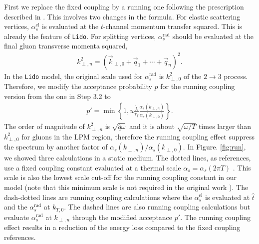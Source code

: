 \documentclass[aps, prc, reprint, amsmath, groupedaddress, nofootinbib]{revtex4-1}
\begin{document}
{First we replace the fixed coupling by a running one following the prescription described in \cite{Arnold:2008zu}.
This involves two changes in the formula. 
For elastic scattering vertices, $\alpha_s^{\textrm{el}}$ is evaluated at the $t$-channel momentum transfer squared. 
This is already the feature of {\tt Lido}.
For splitting vertices,  $\alpha_s^{\textrm{rad}}$ should be evaluated at the final gluon transverse momenta squared,
\begin{eqnarray}\label{eq:kTn}
k_{\perp,n}^2 = \left(\vec{k}_{\perp,0}+\vec{q}_1+\cdots+\vec{q}_n\right)^2.
\end{eqnarray} 
In the {\tt Lido} model, the original scale used for $\alpha_s^{\textrm{rad}}$ is $k_{\perp,0}^2$ of the $2\rightarrow 3$ process.
Therefore, we modify the acceptance probability $p$ for the running coupling version from the one in Step 3.2 to
\begin{eqnarray}
p' = \min\left\{1, u\frac{\tilde{\lambda}}{\tau_f}\frac{\alpha_s(k_{\perp,n})}{\alpha_s(k_{\perp,0})}\right\}.
\end{eqnarray}
The order of magnitude of $k_{\perp,n}^2$ is $\sqrt{\hat{q}\omega}$ and it is about $\sqrt{\omega/T}$ times larger than $k_{\perp,0}^2$ for gluons in the LPM region, therefore the running coupling effect suppress the spectrum by another factor of $\alpha_s(k_{\perp,n})/\alpha_s(k_{\perp,0})$.
In Figure. \ref{fig:run}, we showed three calculations in a static medium. The dotted lines, as references, use a fixed coupling constant evaluated at a thermal scale $\alpha_s = \alpha_s(2\pi T)$ .
This scale is also the lowest scale cut-off for the running coupling constant in our model (note that this minimum scale is not required in the original work \cite{Arnold:2008zu}).
The dash-dotted lines are running coupling calculations where the $\alpha_s^{\textrm{el}}$ is evaluated at $\hat{t}$ and the $\alpha_s^{\textrm{rad}}$ at $k_{T,0}$.
The dashed lines are also running coupling calculations but evaluate $\alpha_s^{\textrm{rad}}$ at $k_{\perp,n}$ through the modified acceptance $p'$.
The running coupling effect results in a reduction of the energy loss compared to the fixed coupling references.

}
\end{document}
